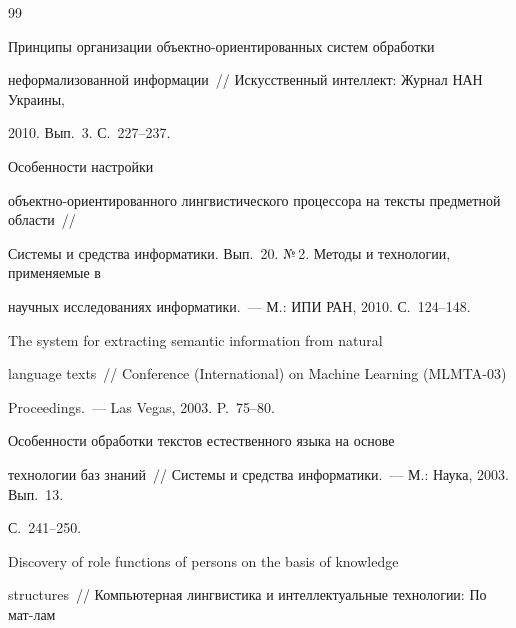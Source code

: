 {{\begin{thebibliography}{99}




     Принципы организации объектно-ори\-ен\-ти\-ро\-ван\-ных систем обработки 


неформализованной информации~/\!\!/ Искусственный интеллект: Журнал НАН Украины, 


2010. Вып.~3. С.~227--237. 







      Особенности настройки 


     объектно-ориентированного лингвистического процессора на тексты предметной области~/\!\!/ 


Системы и средства информатики. Вып.~20. №\,2. Методы и технологии, применяемые в 


научных исследованиях информатики.~--- М.: ИПИ РАН, 2010. С.~124--148. 







      The system for extracting semantic information from natural 


language texts~/\!\!/ Conference (International) on Machine Learning (MLMTA-03) 


     Proceedings.~--- Las Vegas, 2003. P.~75--80.







      Особенности обработки текстов естественного языка на основе 


технологии баз знаний~/\!\!/ Системы и средства информатики.~--- М.: Наука, 2003. Вып.~13. 


С.~241--250.
















      Discovery of role functions of persons on the basis of knowledge 


structures~/\!\!/ Компьютерная лингвистика и интеллектуальные технологии: По мат-лам 



\end{thebibliography}}}
